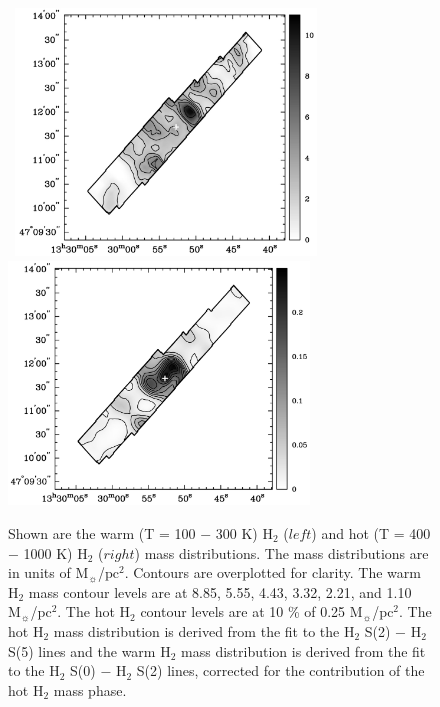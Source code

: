 \documentclass[manuscript]{aastex}
\begin{document}
\clearpage

\begin{figure}[!h]
\centerline{\hbox{\hspace{0.0in}
\includegraphics[width=8cm,angle=0]{bw_warm_h2_mass.jpg}
\hspace{0.1in}
\includegraphics[width=8cm,angle=0]{bw_hot_h2_mass.jpg}}}
\caption{Shown are the warm (T = 100 $-$ 300 K) $\mathrm{H_2}$ ($left$) and hot (T = 400 $-$ 1000 K) $\mathrm{H_2}$ ($right$) mass distributions.  The mass distributions are in units of $\mathrm{M_\sun}$/$\mathrm{pc^2}$.   Contours are overplotted for clarity.  The warm $\mathrm{H_2}$ mass contour levels are at 8.85, 5.55, 4.43, 3.32, 2.21, and 1.10 $\mathrm{M_\sun}$/$\mathrm{pc^2}$.  The hot $\mathrm{H_2}$ contour levels are at 10 \% of 0.25 $\mathrm{M_\sun}$/$\mathrm{pc^2}$.  The hot $\mathrm{H_2}$ mass distribution is derived from the fit to the $\mathrm{H_2}$ S(2) $-$ $\mathrm{H_2}$ S(5) lines and the warm $\mathrm{H_2}$ mass distribution is derived from the fit to the $\mathrm{H_2}$ S(0) $-$ $\mathrm{H_2}$ S(2) lines, corrected for the contribution of the hot $\mathrm{H_2}$ mass phase.  \label{fig3}}
\end{figure}

\clearpage
\end{document}
